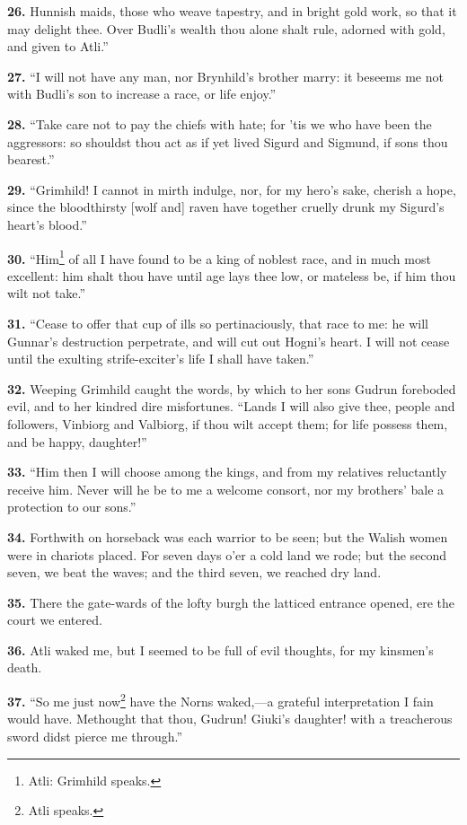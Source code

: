 \textbf{26.} Hunnish maids, those who weave tapestry, and in bright gold
work, so that it may delight thee. Over Budli's wealth thou alone
shalt rule, adorned with gold, and given to Atli.''

\textbf{27.} ``I will not have any man, nor Brynhild's brother marry: it
beseems me not with Budli's son to increase a race, or life enjoy.''

\textbf{28.} ``Take care not to pay the chiefs with hate; for 'tis we who have
been the aggressors: so shouldst thou act as if yet lived Sigurd and
Sigmund, if sons thou bearest.''

\textbf{29.} ``Grimhild! I cannot in mirth indulge, nor, for my hero's sake,
cherish a hope, since the bloodthirsty [wolf and] raven have together
cruelly drunk my Sigurd's heart's blood.''

\textbf{30.} ``Him\footnote{Atli: Grimhild speaks.} of all I have found to be a king of noblest race, and
in much most excellent: him shalt thou have until age lays thee low,
or mateless be, if him thou wilt not take.''

\textbf{31.} ``Cease to offer that cup of ills so pertinaciously, that race to
me: he will Gunnar's destruction perpetrate, and will cut out Hogni's
heart. I will not cease until the exulting strife-exciter's life I
shall have taken.''

\textbf{32.} Weeping Grimhild caught the words, by which to her sons Gudrun
foreboded evil, and to her kindred dire misfortunes. ``Lands I will
also give thee, people and followers, Vinbiorg and Valbiorg, if thou
wilt accept them; for life possess them, and be happy, daughter!''

\textbf{33.} ``Him then I will choose among the kings, and from my relatives
reluctantly receive him. Never will he be to me a welcome consort, nor
my brothers' bale a protection to our sons.''

\textbf{34.} Forthwith on horseback was each warrior to be seen; but the
Walish women were in chariots placed. For seven days o'er a cold land
we rode; but the second seven, we beat the waves; and the third seven,
we reached dry land.

\textbf{35.} There the gate-wards of the lofty burgh the latticed entrance
opened, ere the court we entered.

\textbf{36.} Atli waked me, but I seemed to be full of evil thoughts, for my
kinsmen's death.

\textbf{37.} ``So me just now\footnote{Atli speaks.} have the Norns waked,—a grateful
interpretation I fain would have. Methought that thou, Gudrun! Giuki's
daughter! with a treacherous sword didst pierce me through.''

